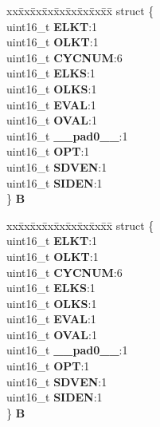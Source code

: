 \begin{DoxyCompactItemize}
\begin{tabbing}
\end{tabbing}\item 
\mbox{\label{unionuSFTCCSR_a9b9b97a799be6fda89e99d20497544be}} 
\begin{tabbing}
xx\=xx\=xx\=xx\=xx\=xx\=xx\=xx\=xx\=\kill
struct \{\\
\>uint16\_t {\bfseries ELKT}:1\\
\>uint16\_t {\bfseries OLKT}:1\\
\>uint16\_t {\bfseries CYCNUM}:6\\
\>uint16\_t {\bfseries ELKS}:1\\
\>uint16\_t {\bfseries OLKS}:1\\
\>uint16\_t {\bfseries EVAL}:1\\
\>uint16\_t {\bfseries OVAL}:1\\
\>uint16\_t {\bfseries \_\_pad0\_\_}:1\\
\>uint16\_t {\bfseries OPT}:1\\
\>uint16\_t {\bfseries SDVEN}:1\\
\>uint16\_t {\bfseries SIDEN}:1\\
\} {\bfseries B}\\

\end{tabbing}\item 
\mbox{\label{unionuSFTCCSR_acf5f5804cea1c2a9bf6acb0e2aac281e}} 
\begin{tabbing}
xx\=xx\=xx\=xx\=xx\=xx\=xx\=xx\=xx\=\kill
struct \{\\
\>uint16\_t {\bfseries ELKT}:1\\
\>uint16\_t {\bfseries OLKT}:1\\
\>uint16\_t {\bfseries CYCNUM}:6\\
\>uint16\_t {\bfseries ELKS}:1\\
\>uint16\_t {\bfseries OLKS}:1\\
\>uint16\_t {\bfseries EVAL}:1\\
\>uint16\_t {\bfseries OVAL}:1\\
\>uint16\_t {\bfseries \_\_pad0\_\_}:1\\
\>uint16\_t {\bfseries OPT}:1\\
\>uint16\_t {\bfseries SDVEN}:1\\
\>uint16\_t {\bfseries SIDEN}:1\\
\} {\bfseries B}\\

\end{tabbing}\end{DoxyCompactItemize}


